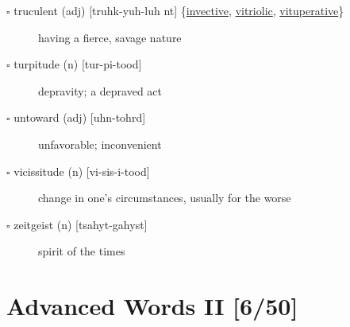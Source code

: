 \documentclass[11pt]{article}
\begin{document}
\begin{description}
\item[{$\square$ \label{orgb5ddc36}truculent (adj) [truhk-yuh-luh nt] \{\hyperref[org56976d1]{invective}, \hyperref[orga346b37]{vitriolic}, \hyperref[org5485467]{vituperative}\}}] having a fierce, savage nature
\item[{$\square$ turpitude (n) [tur-pi-tood]}] depravity; a depraved act
\item[{$\square$ untoward (adj) [uhn-tohrd]}] unfavorable; inconvenient
\item[{$\square$ vicissitude (n) [vi-sis-i-tood]}] change in one's circumstances, usually for the worse
\item[{$\square$ zeitgeist (n) [tsahyt-gahyst]}] spirit of the times
\end{description}
\section{Advanced Words II [6/50]}
\label{sec:orga6e1356}
\end{document}
